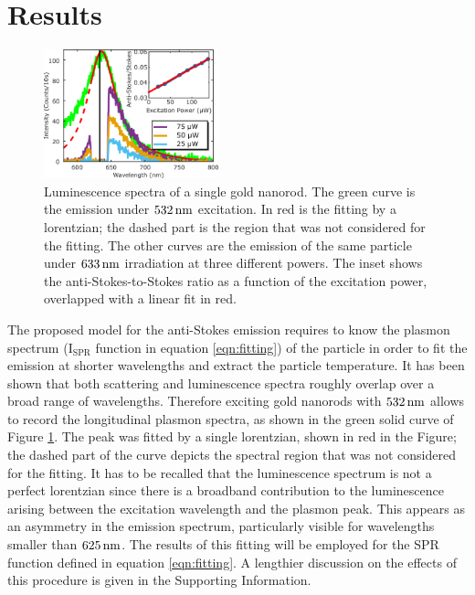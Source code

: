 \section{Results}
\begin{figure}[htp] \centering
\includegraphics[width=0.45\textwidth]{Chapters/04_Anti-Stokes/Figures/02_Several_Intensities/02_several_intensities.png}
\caption{Luminescence spectra of a single gold nanorod. The green curve is the
emission under $532\,\textrm{nm}$ excitation. In red is the fitting by a lorentzian; the
dashed part is the region that was not considered for the fitting. The other
curves are the emission of the same particle under $633\,\textrm{nm}$ irradiation at three 
different powers. The inset shows the anti-Stokes-to-Stokes ratio as a function
of the excitation power, overlapped with a linear fit in red.}
	\label{fig:spectra_rod}
\end{figure}

The proposed model for the anti-Stokes emission requires to know the plasmon
spectrum ($\textrm{I}_{\textrm{SPR}}$ function in equation \ref{eqn:fitting}) of
the particle in order to fit the emission at shorter wavelengths and extract the
particle temperature. It has been shown that both scattering and luminescence
spectra roughly overlap over a broad range of wavelengths\cite{Yorulmaz2012}. Therefore
exciting gold nanorods with $532\,\textrm{nm}$ allows to record the longitudinal plasmon
spectra, as shown in the green solid curve of Figure \ref{fig:spectra_rod}. The
peak was fitted by a single lorentzian, shown in red in the Figure; the dashed
part of the curve depicts the spectral region that was not considered for the
fitting. It has to be recalled that the luminescence spectrum is not a perfect
lorentzian since there is a broadband contribution to the luminescence arising
between the excitation wavelength and the plasmon peak\cite{Boyd1986}. This
appears as an asymmetry in the emission spectrum, particularly visible for
wavelengths smaller than $625\,\textrm{nm}$. The results of this fitting will be employed
for the SPR function defined in equation \ref{eqn:fitting}. A lengthier
discussion on the effects of this procedure is given in the Supporting
Information.

